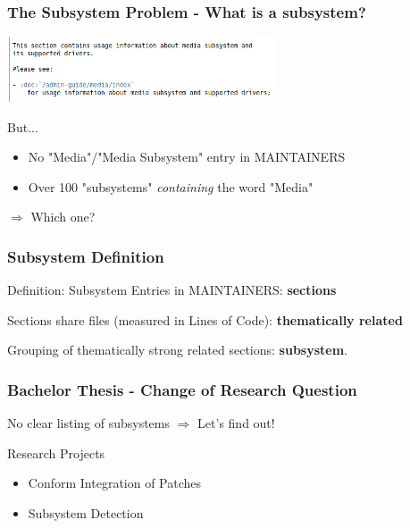\documentclass{beamer}
\begin{document}
	\begin{frame}
	\frametitle{The Subsystem Problem - What is a subsystem?}
	\begin{center}
     	\includegraphics[width=0.6\textwidth]{pics/Media_subsystem.png}
	\end{center}

	\begin{block}{But... }
		\begin{itemize}
		\item No "Media"/"Media Subsystem" entry in MAINTAINERS
		\item Over 100 "subsystems" \textit{containing} the word "Media"
		\end{itemize}
	\end{block}
	\begin{center}
	$\Rightarrow$ Which one?
	\end{center}
	\end{frame}

	\begin{frame} %
	\frametitle{Subsystem Definition}
		\begin{block}{Definition: Subsystem}
			Entries in MAINTAINERS: \textbf{sections}

			Sections share files (measured in Lines of Code): \textbf{thematically related}

			Grouping of thematically strong related sections: \textbf{subsystem}.

		\end{block}
	\end{frame}

	\begin{frame}
	\frametitle{Bachelor Thesis - Change of Research Question}
		\begin{block}{No clear listing of subsystems}
			$\Rightarrow$ Let's find out!
		\end{block}

		\begin{block}{Research Projects}
			\begin{itemize}
				\item Conform Integration of Patches
				\item Subsystem Detection
			\end{itemize}
		\end{block}
	\end{frame}
\end{document}
